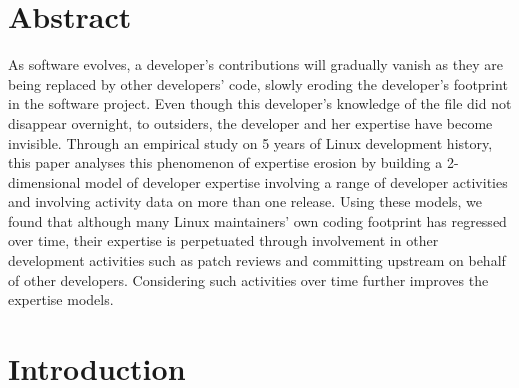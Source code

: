 \label{sec:Theme3}

\section{Abstract}

As software evolves, a developer's contributions will gradually vanish as they are being replaced by other developers' code, slowly eroding the developer's footprint in the software project. Even though this developer's knowledge of the file did not disappear overnight, to outsiders, the developer and her expertise have become invisible. Through an empirical study on 5 years of Linux development history, this paper analyses this phenomenon of expertise erosion by building a 2-dimensional model of developer expertise involving a range of developer activities and involving activity data on more than one release. Using these models, we found that although many Linux maintainers' own coding footprint has regressed over time, their expertise is perpetuated through involvement in other development activities such as patch reviews and committing upstream on behalf of other developers. Considering such activities over time further improves the expertise models.



\section{Introduction}


